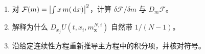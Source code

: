 \begin{exercisebox}
\begin{enumerate}
  \item 对 $\mathcal F(m)=\left\lvert\int x\,m(\,\mathrm{d} x)\right\rvert^2$，计算 $\delta\mathcal F/\delta m$ 与 $D_m\mathcal F$。
  \item 解释为什么 $D_{x_j}U(t,x_i,m_{\symbf{x}}^{N,i})$ 自然带 $1/(N-1)$。
  \item 沿给定连续性方程重新推导主方程中的积分项，并核对符号。
\end{enumerate}
\end{exercisebox}
